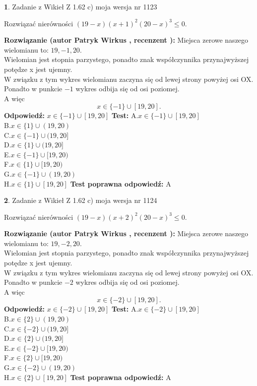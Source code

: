 \documentclass[12pt, a4paper]{article}
\theoremstyle{definition} %
\newtheorem{zad}{}
\newcommand{\zadStart}[1]{\begin{zad}#1\newline}
\newcommand{\zadStop}{\end{zad}}
\newcommand{\rozwStart}[2]{\noindent \textbf{Rozwiązanie (autor #1 , recenzent #2): }\newline}
\newcommand{\rozwStop}{\newline}
\newcommand{\odpStart}{\noindent \textbf{Odpowiedź:}\newline}
\newcommand{\odpStop}{\newline}
\newcommand{\testStart}{\noindent \textbf{Test:}\newline}
\newcommand{\testStop}{\newline}
\newcommand{\kluczStart}{\noindent \textbf{Test poprawna odpowiedź:}\newline}
\newcommand{\kluczStop}{\newline}
\begin{document}
\zadStart{Zadanie z Wikieł Z 1.62 c) moja wersja nr 1123}

Rozwiązać nierówności $(19-x)(x+1)^{2}(20-x)^{3}\le0$.
\zadStop
\rozwStart{Patryk Wirkus}{}
Miejsca zerowe naszego wielomianu to: $19, -1, 20$.\\
Wielomian jest stopnia parzystego, ponadto znak współczynnika przy\linebreak najwyższej potędze x jest ujemny.\\ W związku z tym wykres wielomianu zaczyna się od lewej strony powyżej osi OX.\\
Ponadto w punkcie $-1$ wykres odbija się od osi poziomej.\\
A więc $$x \in \{-1\} \cup [19,20].$$
\rozwStop
\odpStart
$x \in \{-1\} \cup [19,20]$
\odpStop
\testStart
A.$x \in \{-1\} \cup [19,20]$\\
B.$x \in \{1\} \cup (19,20)$\\
C.$x \in \{-1\} \cup (19,20]$\\
D.$x \in \{1\} \cup (19,20]$\\
E.$x \in \{-1\} \cup [19,20)$\\
F.$x \in \{1\} \cup [19,20)$\\
G.$x \in \{-1\} \cup (19,20)$\\
H.$x \in \{1\} \cup [19,20]$
\testStop
\kluczStart
A
\kluczStop



\zadStart{Zadanie z Wikieł Z 1.62 c) moja wersja nr 1124}

Rozwiązać nierówności $(19-x)(x+2)^{2}(20-x)^{3}\le0$.
\zadStop
\rozwStart{Patryk Wirkus}{}
Miejsca zerowe naszego wielomianu to: $19, -2, 20$.\\
Wielomian jest stopnia parzystego, ponadto znak współczynnika przy\linebreak najwyższej potędze x jest ujemny.\\ W związku z tym wykres wielomianu zaczyna się od lewej strony powyżej osi OX.\\
Ponadto w punkcie $-2$ wykres odbija się od osi poziomej.\\
A więc $$x \in \{-2\} \cup [19,20].$$
\rozwStop
\odpStart
$x \in \{-2\} \cup [19,20]$
\odpStop
\testStart
A.$x \in \{-2\} \cup [19,20]$\\
B.$x \in \{2\} \cup (19,20)$\\
C.$x \in \{-2\} \cup (19,20]$\\
D.$x \in \{2\} \cup (19,20]$\\
E.$x \in \{-2\} \cup [19,20)$\\
F.$x \in \{2\} \cup [19,20)$\\
G.$x \in \{-2\} \cup (19,20)$\\
H.$x \in \{2\} \cup [19,20]$
\testStop
\kluczStart
A
\kluczStop
\end{document}
